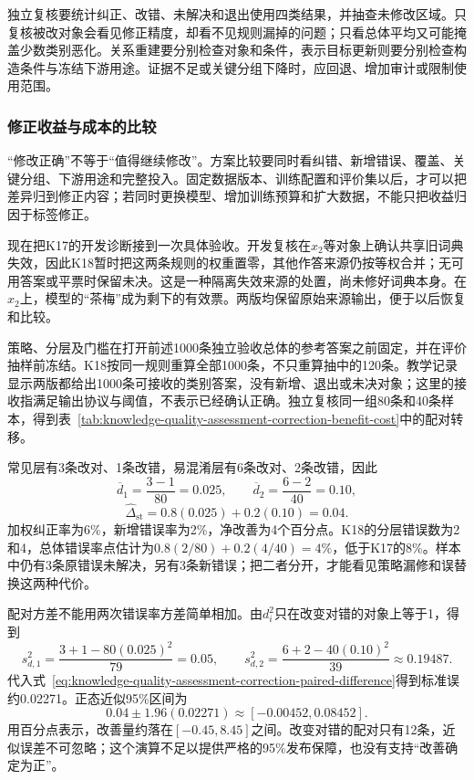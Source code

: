 独立复核要统计纠正、改错、未解决和退出使用四类结果，并抽查未修改区域。只复核被改对象会看见修正精度，却看不见规则漏掉的问题；只看总体平均又可能掩盖少数类别恶化。关系重建要分别检查对象和条件，表示目标更新则要分别检查构造条件与冻结下游用途。证据不足或关键分组下降时，应回退、增加审计或限制使用范围。

\subsubsection{修正收益与成本的比较}
\label{sec:knowledge-quality-assessment-correction-benefit-cost}

“修改正确”不等于“值得继续修改”。方案比较要同时看纠错、新增错误、覆盖、关键分组、下游用途和完整投入。固定数据版本、训练配置和评价集以后，才可以把差异归到修正内容；若同时更换模型、增加训练预算和扩大数据，不能只把收益归因于标签修正。

现在把K17的开发诊断接到一次具体验收。开发复核在$x_2$等对象上确认共享旧词典失效，因此K18暂时把这两条规则的权重置零，其他作答来源仍按等权合并；无可用答案或平票时保留未决。这是一种隔离失效来源的处置，尚未修好词典本身。在$x_2$上，模型的“茶梅”成为剩下的有效票。两版均保留原始来源输出，便于以后恢复和比较。

策略、分层及门槛在打开前述1000条独立验收总体的参考答案之前固定，并在评价抽样前冻结。K18按同一规则重算全部1000条，不只重算抽中的120条。教学记录显示两版都给出1000条可接收的类别答案，没有新增、退出或未决对象；这里的接收指满足输出协议与阈值，不表示已经确认正确。独立复核同一组80条和40条样本，得到表~\ref{tab:knowledge-quality-assessment-correction-benefit-cost}中的配对转移。

常见层有3条改对、1条改错，易混淆层有6条改对、2条改错，因此
\[
  \overline d_1=\frac{3-1}{80}=0.025,\qquad
  \overline d_2=\frac{6-2}{40}=0.10,
\]
\[
  \widehat\Delta_{\mathrm{st}}=0.8(0.025)+0.2(0.10)=0.04.
\]
加权纠正率为6\%，新增错误率为2\%，净改善为4个百分点。K18的分层错误数为2和4，总体错误率点估计为$0.8(2/80)+0.2(4/40)=4\%$，低于K17的8\%。样本中仍有3条原错误未解决，另有3条新错误；把二者分开，才能看见策略漏修和误替换这两种代价。

配对方差不能用两次错误率方差简单相加。由$d_i^2$只在改变对错的对象上等于1，得到
\[
  s_{d,1}^2=\frac{3+1-80(0.025)^2}{79}=0.05,\qquad
  s_{d,2}^2=\frac{6+2-40(0.10)^2}{39}\approx0.19487.
\]
代入式~\eqref{eq:knowledge-quality-assessment-correction-paired-difference}得到标准误约0.02271。正态近似95\%区间为
\[
  0.04\pm1.96(0.02271)
  \approx[-0.00452,0.08452].
\]
用百分点表示，改善量约落在$[-0.45,8.45]$之间。改变对错的配对只有12条，近似误差不可忽略；这个演算不足以提供严格的95\%发布保障，也没有支持“改善确定为正”。

